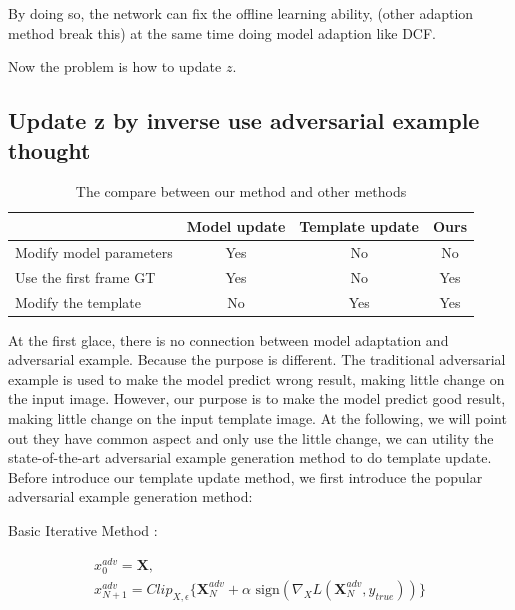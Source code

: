 \documentclass[journal]{IEEEtran}
\begin{document}
By doing so, the network can fix the offline learning ability, (other adaption method break this) at the same time doing model adaption like DCF. 

Now the problem is how to update $z$.

\subsection{Update z by inverse use adversarial example thought}

\begin{table}
\caption{The compare between our method and other methods}
\small
\setlength{\tabcolsep}{3pt}
\begin{tabular}{l c c c}
\toprule
                                 & Model update & Template update & Ours \\
\midrule
Modify model parameters          & Yes          & No              & No   \\
Use the first frame GT           & Yes          & No              & Yes  \\
Modify the template              & No           & Yes             & Yes  \\
\bottomrule
\end{tabular}
\end{table}

At the first glace, there is no connection between model adaptation and adversarial example. Because the purpose is different. The traditional adversarial example is used to make the model predict wrong result, making little change on the input image. However, our purpose is to make the model predict good result, making little change on the input template image. At the following, we will point out they have common aspect and only use the little change, we can utility the state-of-the-art adversarial example generation method to do template update. Before introduce our template update method, we first introduce the popular adversarial example generation method: 

Basic Iterative Method \cite{kurakin2017adversarial}: 

\begin{equation}
\begin{gathered}
    x_0^{adv} = \pmb X, \\
    x_{N+1}^{adv} = Clip_{X,\epsilon}\{\pmb X_N^{adv}+\alpha \text{ sign}(\nabla_X L(\pmb X_N^{adv},y_{true}))\}
\end{gathered}
\end{equation}
\end{document}
